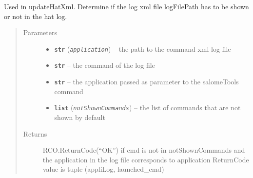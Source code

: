 \documentclass[a4paper,10pt,english]{sphinxmanual}
\begin{document}
\begin{fulllineitems}
\label{commands/apidoc/src:src.utilsSat.reset}
\end{fulllineitems}


\begin{fulllineitems}
\label{commands/apidoc/src:src.utilsSat.show_command_log}
Used in updateHatXml. 
Determine if the log xml file logFilePath 
has to be shown or not in the hat log.
\begin{quote}\begin{description}
\item[{Parameters}] \leavevmode\begin{itemize}
\item {} 
\textbf{\texttt{str}} (\emph{\texttt{application}}) -- the path to the command xml log file

\item {} 
\textbf{\texttt{str}} -- the command of the log file

\item {} 
\textbf{\texttt{str}} -- the application passed as parameter 
to the salomeTools command

\item {} 
\textbf{\texttt{list}} (\emph{\texttt{notShownCommands}}) -- the list of commands 
that are not shown by default

\end{itemize}

\item[{Returns}] \leavevmode
RCO.ReturnCode(``OK'') if cmd is not in notShownCommands and the application 
in the log file corresponds to application
ReturnCode value is tuple (appliLog, launched\_cmd)

\end{description}\end{quote}

\end{fulllineitems}


\begin{fulllineitems}
\label{commands/apidoc/src:src.utilsSat.success}
\end{fulllineitems}
\end{document}
